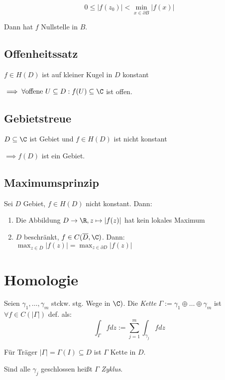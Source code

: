 \vspace*{-3mm}
\[ 0 \leq |f(z_0)| < \min_{x \in \partial B} |f(x)| \]

Dann hat \(f\) Nullstelle in \(B\).

\subsection*{Offenheitssatz}

\(f \in H(D)\) ist auf kleiner Kugel in \(D\) konstant

\(\implies \forall \text{offene } U \subseteq D : f(U) \subseteq \C\) ist offen.

\subsection*{Gebietstreue}

\(D \subseteq \C\) ist Gebiet und \(f \in H(D)\) ist nicht konstant

\(\implies f(D)\) ist ein Gebiet.

\subsection*{Maximumsprinzip}

Sei \(D\) Gebiet, \(f \in H(D)\) nicht konstant. Dann:

\begin{enumerate}[label=(\alph*)]
	\item Die Abbildung \(D \to \R, z \mapsto |f(z)|\) hat kein lokales Maximum
	\item \(D\) beschränkt, \(f \in C(\overline D,\C)\). Dann: \\ \(\max_{z \in \overline D} |f(z)| = \max_{z \in \partial D} |f(z)|\)
\end{enumerate}

\section*{Homologie}

Seien \(\gamma_1,\dots,\gamma_m\) stckw. stg. Wege in \(\C)\). Die \emph{Kette} \(\Gamma := \gamma_1 \oplus \dots \oplus \gamma_m\) ist \(\forall f \in C(|\Gamma|)\) def. als: \[\int_\Gamma f dz := \sum_{j=1}^m \int_{\gamma_j} f dz\]

Für Träger \(|\Gamma| = \Gamma(I) \subseteq D\) ist \(\Gamma\) Kette in \(D\).

Sind alle \(\gamma_j\) geschlossen heißt \(\Gamma\) \emph{Zyklus}.


